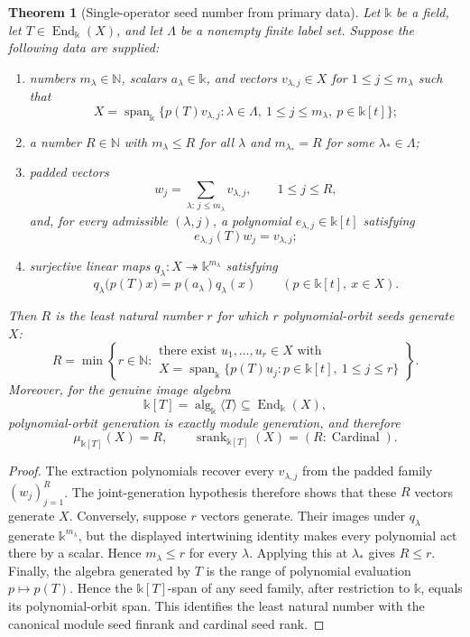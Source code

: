 \documentclass[11pt]{article}
\newtheorem{theorem}{Theorem}[section]
\theoremstyle{definition}
\theoremstyle{remark}
\newcommand{\srank}{\operatorname{srank}}
\newcommand{\Span}{\operatorname{span}}
\newcommand{\End}{\operatorname{End}}
\newcommand{\bbk}{\mathbb{k}}
\newcommand{\N}{\mathbb N}
\begin{document}
\begin{theorem}[Single-operator seed number from primary data]
\label{thm:single-operator}
Let $\bbk$ be a field, let $T\in\End_{\bbk}(X)$, and let $\Lambda$ be a
nonempty finite label set.  Suppose the following data are supplied:
\begin{enumerate}[label=(\roman*)]
\item numbers $m_{\lambda}\in\N$, scalars $a_{\lambda}\in\bbk$, and vectors
$v_{\lambda,j}\in X$ for $1\le j\le m_{\lambda}$ such that
\[
X=\Span_{\bbk}\{p(T)v_{\lambda,j}:
  \lambda\in\Lambda,\ 1\le j\le m_{\lambda},\ p\in\bbk[t]\};
\]
\item a number $R\in\N$ with $m_{\lambda}\le R$ for all $\lambda$ and
$m_{\lambda_*}=R$ for some $\lambda_*\in\Lambda$;
\item padded vectors
\[
w_j=\sum_{\lambda:\,j\le m_{\lambda}}v_{\lambda,j},
\qquad 1\le j\le R,
\]
and, for every admissible $(\lambda,j)$, a polynomial
$e_{\lambda,j}\in\bbk[t]$ satisfying
\[
e_{\lambda,j}(T)w_j=v_{\lambda,j};
\]
\item surjective linear maps
$q_{\lambda}:X\twoheadrightarrow\bbk^{m_{\lambda}}$ satisfying
\[
q_{\lambda}\bigl(p(T)x\bigr)
=p(a_{\lambda})q_{\lambda}(x)
\qquad(p\in\bbk[t],\ x\in X).
\]
\end{enumerate}
Then $R$ is the least natural number $r$ for which $r$ polynomial-orbit
seeds generate $X$:
\[
\boxed{
R=\min\left\{r\in\N:
\begin{array}{l}
\text{there exist }u_1,\ldots,u_r\in X\text{ with}\\[2pt]
X=\Span_{\bbk}\{p(T)u_j:p\in\bbk[t],\ 1\le j\le r\}
\end{array}
\right\}.
}
\]
Moreover, for the genuine image algebra
\[
\bbk[T]=\operatorname{alg}_{\bbk}\langle T\rangle
\subseteq\End_{\bbk}(X),
\]
polynomial-orbit generation is exactly module generation, and therefore
\[
\boxed{
\mu_{\bbk[T]}(X)=R,
\qquad
\srank_{\bbk[T]}(X)=(R:\operatorname{Cardinal}).
}
\]
\end{theorem}

\begin{proof}
The extraction polynomials recover every $v_{\lambda,j}$ from the padded
family $(w_j)_{j=1}^{R}$.  The joint-generation hypothesis therefore shows
that these $R$ vectors generate $X$.  Conversely, suppose $r$ vectors
generate.  Their images under $q_{\lambda}$ generate
$\bbk^{m_{\lambda}}$, but the displayed intertwining identity makes every
polynomial act there by a scalar.  Hence $m_{\lambda}\le r$ for every
$\lambda$.  Applying this at $\lambda_*$ gives $R\le r$.  Finally,
the algebra generated by $T$ is the range of polynomial evaluation
$p\mapsto p(T)$.  Hence the $\bbk[T]$-span of any seed family, after
restriction to $\bbk$, equals its polynomial-orbit span.  This identifies the
least natural number with the canonical module seed finrank and cardinal seed
rank.
\end{proof}
\end{document}
